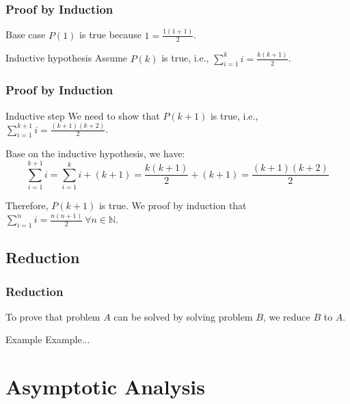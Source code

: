 \documentclass[t]{beamer}
\begin{document}
            \begin{frame}
                \frametitle{Proof by Induction}
                \begin{block}{Base case}
                    $P(1)$ is true because $1 = \frac{1(1+1)}{2}$.
                \end{block}

                \begin{block}{Inductive hypothesis}
                    Assume $P(k)$ is true, i.e., $\sum_{i = 1}^{k} i = \frac{k(k+1)}{2}$.
                \end{block}
            \end{frame}

            \begin{frame}
                \frametitle{Proof by Induction}
                \begin{block} {Inductive step}
                    We need to show that $P(k+1)$ is true, i.e., $\sum_{i = 1}^{k+1} i = \frac{(k+1)(k+2)}{2}$.

                    \bigskip
                    Base on the inductive hypothesis, we have:
                    \[\sum _{i = 1}^{k+1} i = \sum _{i = 1}^{k} i + (k+1) = \frac{k(k+1)}{2} + (k+1) = \frac{(k+1)(k+2)}{2}\]

                    \bigskip
                    Therefore, $P(k+1)$ is true. We proof by induction that $\sum_{i = 1}^{n} i = \frac{n(n+1)}{2}\ \forall n \in \mathbb{N}$.
                \end{block}
            \end{frame}

        \subsection{Reduction}
            \begin{frame}
                \frametitle{Reduction}
                To prove that problem $A$ can be solved by solving problem $B$, we reduce $B$ to $A$.

                \begin{block}{Example}
                    Example...
                \end{block}
            \end{frame}


    \section{Asymptotic Analysis}
\end{document}
